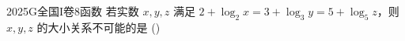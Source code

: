 
\begin{problem}{2025}{G}{全国I卷}{8}{函数}
若实数 $x,y,z$ 满足 $2+\log_2 x = 3+\log_3 y = 5+\log_5 z$，则 $x,y,z$ 的大小关系不可能的是
(\hspace{1cm})
\begin{choices}
\end{choices}
\end{problem}